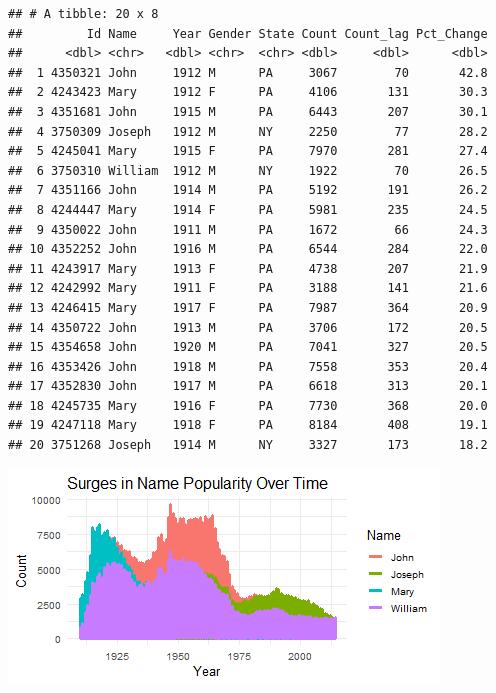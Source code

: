 \documentclass[11pt,preprint]{elsarticle}
\let\origfigure\figure
\let\endorigfigure\endfigure
\renewenvironment{figure}[1][2] {
    \expandafter\origfigure\expandafter[H]
} {
    \endorigfigure
}
\numberwithin{equation}{section}
\numberwithin{figure}{section}
\numberwithin{table}{section}
\begin{document}
\begin{verbatim}
## # A tibble: 20 x 8
##         Id Name     Year Gender State Count Count_lag Pct_Change
##      <dbl> <chr>   <dbl> <chr>  <chr> <dbl>     <dbl>      <dbl>
##  1 4350321 John     1912 M      PA     3067        70       42.8
##  2 4243423 Mary     1912 F      PA     4106       131       30.3
##  3 4351681 John     1915 M      PA     6443       207       30.1
##  4 3750309 Joseph   1912 M      NY     2250        77       28.2
##  5 4245041 Mary     1915 F      PA     7970       281       27.4
##  6 3750310 William  1912 M      NY     1922        70       26.5
##  7 4351166 John     1914 M      PA     5192       191       26.2
##  8 4244447 Mary     1914 F      PA     5981       235       24.5
##  9 4350022 John     1911 M      PA     1672        66       24.3
## 10 4352252 John     1916 M      PA     6544       284       22.0
## 11 4243917 Mary     1913 F      PA     4738       207       21.9
## 12 4242992 Mary     1911 F      PA     3188       141       21.6
## 13 4246415 Mary     1917 F      PA     7987       364       20.9
## 14 4350722 John     1913 M      PA     3706       172       20.5
## 15 4354658 John     1920 M      PA     7041       327       20.5
## 16 4353426 John     1918 M      PA     7558       353       20.4
## 17 4352830 John     1917 M      PA     6618       313       20.1
## 18 4245735 Mary     1916 F      PA     7730       368       20.0
## 19 4247118 Mary     1918 F      PA     8184       408       19.1
## 20 3751268 Joseph   1914 M      NY     3327       173       18.2
\end{verbatim}

\begin{figure}[H]

{\centering \includegraphics{23034103_Q1USbabynames_files/figure-latex/Figure 2a-1} 

}

\caption{Caption Here \label{Figure1}}\label{fig:Figure 2a}
\end{figure}
\end{document}

